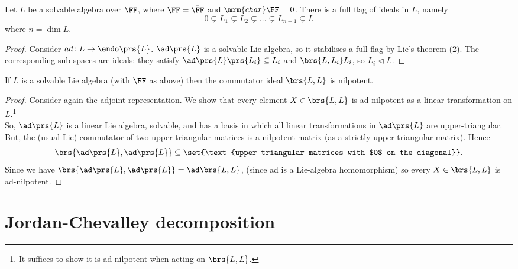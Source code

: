 \documentclass[10pt,a4paper,twoside,openany,hidelinks]{book}
\begin{document}
\begin{corollary}
Let $L$ be a solvable algebra over $\FF$, where $\FF =\bar{\FF}$ and $\mrm{char}\FF = 0$. There is a full flag of ideals in $L$, namely
\[0 \subsetneq L_1 \subsetneq L_2 \subsetneq \ldots \subsetneq L_{n-1} \subsetneq L\]
where $n = \dim L$.
\end{corollary}
\begin{proof}
Consider $ad \colon L \to \endo\prs{L}$. $\ad\prs{L}$ is a solvable Lie algebra, so it stabilises a full flag by Lie's theorem (2). The corresponding sub-spaces are ideals: they satisfy
$\ad\prs{L} \prs{L_i} \subseteq L_i$ and $\brs{L,L_i}L_i$, so $L_i \triangleleft L$.
\end{proof}
\begin{corollary}
If $L$ is a solvable Lie algebra (with $\FF$ as above) then the commutator ideal $\brs{L,L}$ is nilpotent.
\end{corollary}
\begin{proof}
Consider again the adjoint representation. We show that every element $X \in \brs{L,L}$ is ad-nilpotent as a linear transformation on $L$.\footnote{It suffices to show it is ad-nilpotent when acting on $\brs{L,L}$.}\\
So, $\ad\prs{L}$ is a linear Lie algebra, solvable, and has a basis in which all linear transformations in $\ad\prs{L}$ are upper-triangular.
But, the (usual Lie) commutator of two upper-triangular matrices is a nilpotent matrix (as a strictly upper-triangular matrix). Hence \[\brs{\ad\prs{L},\ad\prs{L}} \subseteq \set{\text{upper triangular matrices with $0$ on the diagonal}}\text{.}\]
Since we have $\brs{\ad\prs{L},\ad\prs{L}} = \ad\brs{L,L}$, (since ad is a Lie-algebra homomorphism) so every $X \in \brs{L,L}$ is ad-nilpotent.
\end{proof}

\chapter{Jordan-Chevalley decomposition}
\end{document}
